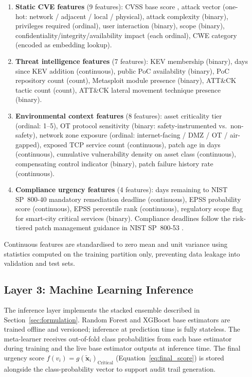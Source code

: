 \documentclass[review,12pt]{elsarticle}
\begin{document}
\begin{enumerate}[label=(\roman*)]
  \item \textbf{Static CVE features} (9 features): CVSS base score \citep{cvss}, attack vector (one-hot: network / adjacent / local / physical), attack complexity (binary), privileges required (ordinal), user interaction (binary), scope (binary), confidentiality/integrity/availability impact (each ordinal), CWE category \citep{cwe} (encoded as embedding lookup).
  \item \textbf{Threat intelligence features} (7 features): KEV membership (binary), days since KEV addition (continuous), public PoC availability (binary), PoC repository count (count), Metasploit module presence (binary), ATT\&CK tactic count (count), ATT\&CK lateral movement technique presence (binary).
  \item \textbf{Environmental context features} (8 features): asset criticality tier (ordinal: 1--5), OT protocol sensitivity (binary: safety-instrumented vs.\ non-safety), network zone exposure (ordinal: internet-facing / DMZ / OT / air-gapped), exposed TCP service count (continuous), patch age in days (continuous), cumulative vulnerability density on asset class (continuous), compensating control indicator (binary), patch failure history rate (continuous).
  \item \textbf{Compliance urgency features} (4 features): days remaining to NIST SP~800-40 \citep{nist_800_40} mandatory remediation deadline (continuous), EPSS probability score (continuous), EPSS percentile rank (continuous), regulatory scope flag for smart-city critical services (binary). Compliance deadlines follow the risk-tiered patch management guidance in NIST SP~800-53 \citep{nist_800_53}.
\end{enumerate}

Continuous features are standardised to zero mean and unit variance using statistics computed on the training partition only, preventing data leakage into validation and test sets.

\subsection{Layer 3: Machine Learning Inference}

The inference layer implements the stacked ensemble described in Section~\ref{sec:formulation}. Random Forest and XGBoost base estimators are trained offline and versioned; inference at prediction time is fully stateless. The meta-learner receives out-of-fold class probabilities from each base estimator during training and the live base estimator outputs at inference time. The final urgency score $f(v_i) = g(\tilde{\mathbf{x}}_i)_{\text{Critical}}$ (Equation~\ref{eq:final_score}) is stored alongside the class-probability vector to support audit trail generation.
\end{document}
